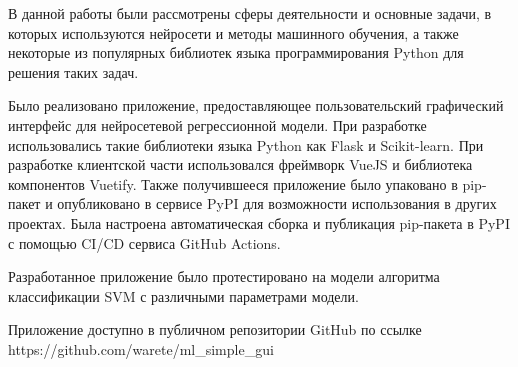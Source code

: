 \conclusion
В данной работы были рассмотрены сферы деятельности и основные задачи, в которых используются нейросети и методы машинного обучения, а также некоторые из популярных библиотек языка программирования Python для решения таких задач.


Было реализовано приложение, предоставляющее пользовательский графический интерфейс для нейросетевой регрессионной модели. При разработке использовались такие библиотеки языка Python как Flask и Scikit-learn. При разработке клиентской части использовался фреймворк VueJS и библиотека компонентов Vuetify. Также получившееся приложение было упаковано в pip-пакет и опубликовано в сервисе PyPI для возможности использования в других проектах. Была настроена автоматическая сборка и публикация pip-пакета в PyPI с помощью CI/CD сервиса GitHub Actions.


Разработанное приложение было протестировано на модели алгоритма классификации SVM с различными параметрами модели. 

Приложение доступно в публичном репозитории GitHub по ссылке 
\\
https://github.com/warete/ml\_simple\_gui
